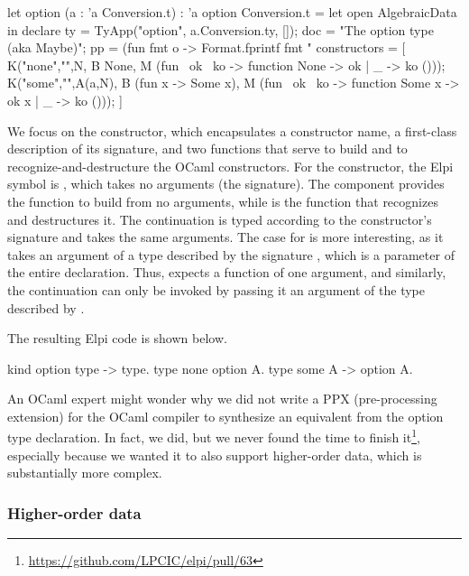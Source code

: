 \documentclass{these-ISSS}
\newenvironment{elpicode}
  {\VerbatimEnvironment\begin{elpibox}\begin{xelpicode}}{\end{xelpicode}
\end{elpibox}}
\newenvironment{ocamlcode}
  {\VerbatimEnvironment\begin{ocamlbox}\begin{xocamlcode}}{\end{xocamlcode}
\end{ocamlbox}}
\begin{document}
\begin{ocamlcode}
let option (a : 'a Conversion.t) : 'a option Conversion.t =
  let open AlgebraicData in
  declare {
    ty = TyApp("option", a.Conversion.ty, []); %
    doc = "The option type (aka Maybe)";
    pp = (fun fmt o ->
      Format.fprintf fmt "%
    constructors = [
      K("none","",N,
        B None,
        M (fun ~ok ~ko -> function None -> ok | _ -> ko ())); 
      K("some","",A(a,N),
        B (fun x -> Some x),
        M (fun ~ok ~ko -> function Some x -> ok x | _ -> ko ())); 
    ]
  }
\end{ocamlcode}

\noindent
We focus on the  constructor, which encapsulates a constructor name,
a first-class description of its signature, and two functions that serve to
build and to recognize-and-destructure the OCaml constructors. For the
 constructor, the Elpi symbol is , which takes no
arguments (the  signature). The  component provides the
function to build  from no arguments, while  is the
function that recognizes and destructures it. The  continuation is
typed according to the constructor's signature and takes the same arguments.
The case for  is more interesting, as it takes an argument of a
type described by the signature , which is a parameter of the entire
declaration. Thus,  expects a function of one argument, and
similarly, the continuation  can only be invoked by passing it an
argument of the type described by .

The resulting Elpi code is shown below.

\begin{elpicode}
kind option type -> type.
type none option A.
type some A -> option A.
\end{elpicode}

An OCaml expert might wonder why we did not write a PPX (pre-processing
extension) for the OCaml compiler to synthesize an equivalent
 from the option type declaration. In fact, we did, but we
never found the time to finish it\footnote{\url{https://github.com/LPCIC/elpi/pull/63}},
especially because we wanted it to also support higher-order data, which is
substantially more complex.


\subsubsection{Higher-order data}\label{sec:hodata}
\end{document}
